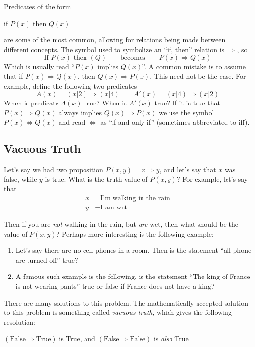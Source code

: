 \documentclass{book}
\renewcommand{\mid}{\big|}
\newcommand{\Rw}{\Rightarrow}
\newcommand{\LRw}{\Leftrightarrow}
\begin{document}
Predicates of the form
\begin{center}
	if $P(x)$ then $Q(x)$
\end{center}
are some of the most common, allowing for relations being made between
different concepts. The symbol used to symbolize an ``if, then'' relation is $\Rw$, so
\[
	\text{If $P(x)$ then $(Q)$} \qquad \text{becomes}\qquad P(x) \Rw Q(x)
\]
Which is usually read ``$P(x)$ implies $Q(x)$''. A  common mistake is to assume that if $P(x) \Rw Q(x)$, then $Q(x) \Rw
P(x)$. This need not be the case. For example, define the following two predicates
\[
	A(x) = (x\mid 2) \Rw (x\mid 4) \qquad A'(x) = (x\mid 4) \Rw (x \mid 2)
\]
When is predicate $A(x)$ true? When is $A'(x)$ true? If it is true that $P(x) \Rw Q(x)$ always implies $Q(x)
\Rw P(x)$ we use the symbol $P(x) \LRw Q(x)$ and read $\LRw$ as ``if and only if'' (sometimes abbreviated to
iff).


\subsection*{Vacuous Truth}

Let's say we had two proposition $P(x,y)  = x \Rw y$, and let's say that $x$ was false, while $y$ is true. What is the
truth value of $P(x,y)$? For example, let's say that
\begin{align*}
	x &= \text{I'm walking in the rain}\\
	y &= \text{I am wet}
\end{align*}

Then if you are \emph{not} walking in the rain, but \emph{are} wet, then what should be the value of $P(x,y)$?
Perhaps more interesting is the following example:
\begin{enumerate}
	\item Let's say there are no cell-phones in a room. Then is the statement ``all phone are turned off'' true?

	\item A famous such example is the following, is the statement ``The king of France is not wearing pants'' true
		or false if France does not have a king?
\end{enumerate}

There are many solutions to this problem. The mathematically accepted solution to this problem is something
called \emph{vacuous truth}, which gives the following resolution:

\begin{center}
	$(\text{False} \Rw \text{True})$ is True, and $(\text{False} \Rw \text{False})$ is \emph{also} True
\end{center}
\end{document}
